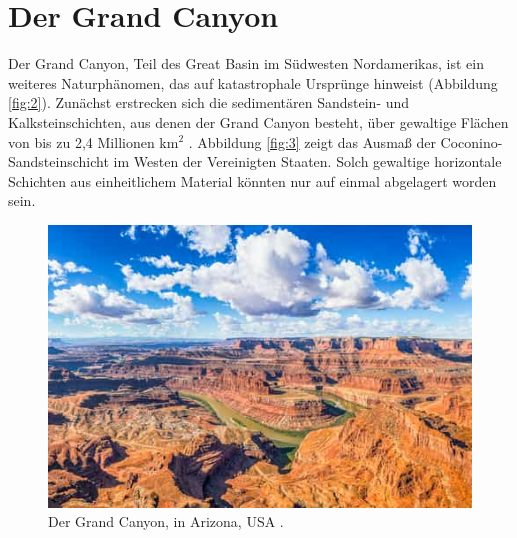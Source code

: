 \documentclass[10pt,twocolumn,letterpaper]{article}
\begin{document}
\section{Der Grand Canyon}

Der Grand Canyon, Teil des Great Basin im Südwesten Nordamerikas, ist ein weiteres Naturphänomen, das auf katastrophale Ursprünge hinweist (Abbildung \ref{fig:2}). Zunächst erstrecken sich die sedimentären Sandstein- und Kalksteinschichten, aus denen der Grand Canyon besteht, über gewaltige Flächen von bis zu 2,4 Millionen km$^2$ \cite{21}. Abbildung \ref{fig:3} zeigt das Ausmaß der Coconino-Sandsteinschicht im Westen der Vereinigten Staaten. Solch gewaltige horizontale Schichten aus einheitlichem Material könnten nur auf einmal abgelagert worden sein.

\begin{figure}[t]
\begin{center}
   \includegraphics[width=1\linewidth]{grand-canyon.jpg}
\end{center}
   \caption{Der Grand Canyon, in Arizona, USA \cite{49}.}
\label{fig:2}
\label{fig:onecol}
\end{figure}
\end{document}
